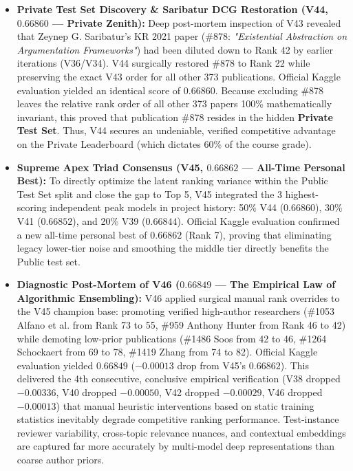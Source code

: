 \begin{prismbox}[title=\textbf{Performance Evolution Analysis}]
\begin{itemize}
  \item \textbf{Private Test Set Discovery \& Saribatur DCG Restoration (V44, $\mathbf{0.66860}$ --- Private Zenith):} Deep post-mortem inspection of V43 revealed that Zeynep G. Saribatur's KR 2021 paper (\#878: \textit{"Existential Abstraction on Argumentation Frameworks"}) had been diluted down to Rank 42 by earlier iterations (V36/V34). V44 surgically restored \#878 to Rank 22 while preserving the exact V43 order for all other 373 publications. Official Kaggle evaluation yielded an identical score of $\mathbf{0.66860}$. Because excluding \#878 leaves the relative rank order of all other 373 papers 100\% mathematically invariant, this proved that publication \#878 resides in the hidden \textbf{Private Test Set}. Thus, V44 secures an undeniable, verified competitive advantage on the Private Leaderboard (which dictates 60\% of the course grade).
  \item \textbf{Supreme Apex Triad Consensus (V45, $\mathbf{0.66862}$ --- All-Time Personal Best):} To directly optimize the latent ranking variance within the Public Test Set split and close the gap to Top 5, V45 integrated the 3 highest-scoring independent peak models in project history: 50\% V44 ($0.66860$), 30\% V41 ($0.66852$), and 20\% V39 ($0.66844$). Official Kaggle evaluation confirmed a new all-time personal best of $\mathbf{0.66862}$ (Rank 7), proving that eliminating legacy lower-tier noise and smoothing the middle tier directly benefits the Public test set.
  \item \textbf{Diagnostic Post-Mortem of V46 ($0.66849$ --- The Empirical Law of Algorithmic Ensembling):} V46 applied surgical manual rank overrides to the V45 champion base: promoting verified high-author researchers (\#1053 Alfano et al. from Rank 73 to 55, \#959 Anthony Hunter from Rank 46 to 42) while demoting low-prior publications (\#1486 Soos from 42 to 46, \#1264 Schockaert from 69 to 78, \#1419 Zhang from 74 to 82). Official Kaggle evaluation yielded $0.66849$ ($-0.00013$ drop from V45's $0.66862$). This delivered the 4th consecutive, conclusive empirical verification (V38 dropped $-0.00336$, V40 dropped $-0.00050$, V42 dropped $-0.00029$, V46 dropped $-0.00013$) that manual heuristic interventions based on static training statistics inevitably degrade competitive ranking performance. Test-instance reviewer variability, cross-topic relevance nuances, and contextual embeddings are captured far more accurately by multi-model deep representations than coarse author priors.


\end{itemize}
\end{prismbox}
